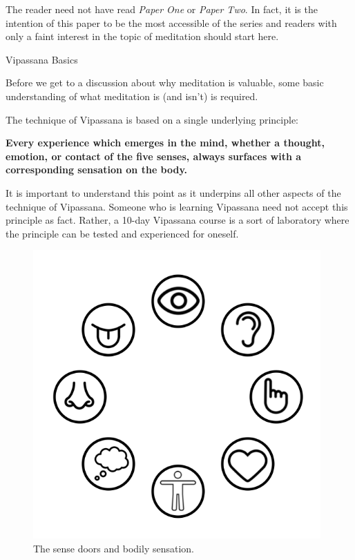 \documentclass{article}
\begin{document}
The reader need not have read \textit{Paper One} or \textit{Paper Two}. In fact, it
is the intention of this paper to be the most accessible of the series and readers
with only a faint interest in the topic of meditation should start here.

\pagebreak

\begin{center}
  \Huge{Vipassana Basics}
\end{center}

Before we get to a discussion about why meditation is valuable, some basic
understanding of what meditation is (and isn't) is required.

The technique of Vipassana is based on a single underlying principle:

\vspace{1cm}
\textbf{Every experience which emerges in the mind, whether a thought, emotion, or contact of the five senses, always surfaces with a corresponding sensation on the body.}
\vspace{1cm}

It is important to understand this point as it underpins all other aspects of the
technique of Vipassana. Someone who is learning Vipassana need not accept this
principle as fact. Rather, a 10-day Vipassana course is a sort of laboratory where the
principle can be tested and experienced for oneself.

\begin{figure}[H]
  \centering
  \includegraphics[width=11cm]{images/sense-doors.png}
  \caption{The sense doors and bodily sensation.}
  \label{fig:sense-doors}
\end{figure}
\end{document}
